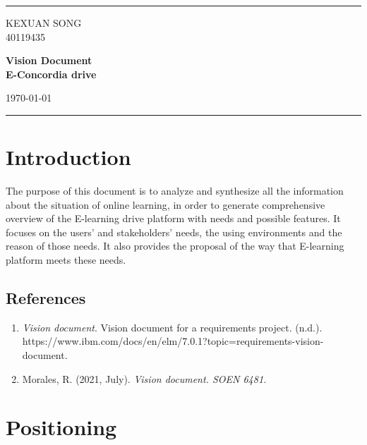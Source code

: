 \documentclass[a4paper]{article}
\begin{document}

\fancyhead[C]{}
\hrule\bigskip %
\begin{minipage}{0.295\textwidth} 
\raggedright
\normalsize
KEXUAN SONG \hfill\\   
40119435\hfill\\
\end{minipage}
\begin{minipage}{0.4\textwidth} 
\centering 
\Large
\textbf{Vision Document}\hfill\\
\textbf{E-Concordia drive}\hfill\\ 
\normalsize 
\end{minipage}
\begin{minipage}{0.295\textwidth} 
\raggedleft
\today\hfill\\
\end{minipage}
\medskip\hrule 
\bigskip


\section{Introduction}
The purpose of this document is to analyze and synthesize all the information about the situation of online learning, in order to generate comprehensive overview of the E-learning drive platform with needs and possible features.  It focuses on the users’ and stakeholders’ needs, the using environments and the reason of those needs. It also provides the proposal of the way that E-learning platform meets these needs.

\subsection{References}
\begin{enumerate}
\setcounter{enumi}{0}
\item \textit{Vision document}. Vision document for a requirements project. (n.d.).\\ https://www.ibm.com/docs/en/elm/7.0.1?topic=requirements-vision-document. \\
\item Morales, R. (2021, July). \textit{Vision document. SOEN 6481.} \\ 
\end{enumerate}


\section{Positioning}
\end{document}
